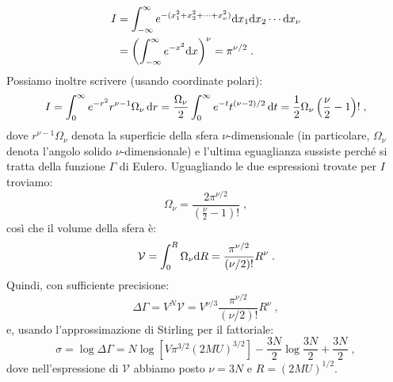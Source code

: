 \begin{align}
I &= \int_{-\infty}^{\infty}e^{-(x_1^2+x_2^2+\cdots +x_{\nu}^2)}\mathrm{d}{x_1}\mathrm{d}{x_2}\cdots\mathrm{d}{x_{\nu}} \notag \\
&=\left(\int_{-\infty}^{\infty}e^{-x^2}\mathrm{d}{x}\right)^{\nu}=\pi^{\nu/2}\;.
\end{align}
Possiamo inoltre scrivere (usando coordinate polari):
\begin{align}
I =\int_0^{\infty}e^{-r^2}r^{\nu-1}\Omega_{\nu}\,\mathrm{d}{r}=\frac{\Omega_{\nu}}{2}\int_0^{\infty}e^{-t}t^{(\nu-2)/2}\,\mathrm{d}{t}=\frac{1}{2}\Omega_{\nu}\left(\frac{\nu}{2}-1\right)!\;,
\end{align}
dove $r^{\nu-1}\Omega_{\nu}$ denota la superficie della sfera $\nu$-dimensionale (in particolare, $\Omega_{\nu}$ denota l'angolo solido $\nu$-dimensionale) e l'ultima eguaglianza sussiste perché si tratta della funzione $\Gamma$ di Eulero. Uguagliando le due espressioni trovate per $I$ troviamo:
\begin{equation}
\Omega_{\nu}=\frac{2\pi^{\nu/2}}{\left(\frac{\nu}{2}-1\right)!}\;, %
\end{equation}
così che il volume della sfera è:
\begin{equation}
\mathcal{V}=\int_0^R \Omega_{\nu}\mathrm{d}{R}=\frac{\pi^{\nu/2}}{(\nu/2)!}R^{\nu}\;.
\end{equation}
Quindi, con sufficiente precisione:
\begin{equation}
\Delta\Gamma=V^N\mathcal{V}=V^{\nu/3}\frac{\pi^{\nu/2}}{(\nu/2)!}R^{\nu}\;,
\end{equation}
e, usando l'approssimazione di Stirling per il fattoriale:
\begin{equation}
\sigma=\log\Delta\Gamma=N\log[V\pi^{3/2}(2MU)^{3/2}]-\frac{3N}{2}\log\frac{3N}{2}+\frac{3N}{2}\;, \label{sec6_entropy}
\end{equation}
dove nell'espressione di $\mathcal{V}$ abbiamo posto $\nu=3N$ e $R=(2MU)^{1/2}$. \\

